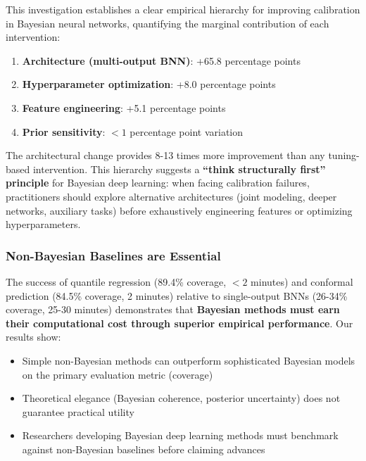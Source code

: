 This investigation establishes a clear empirical hierarchy for improving calibration in Bayesian neural networks, quantifying the marginal contribution of each intervention:

\begin{enumerate}
    \item \textbf{Architecture (multi-output BNN)}: +65.8 percentage points
    \item \textbf{Hyperparameter optimization}: +8.0 percentage points
    \item \textbf{Feature engineering}: +5.1 percentage points
    \item \textbf{Prior sensitivity}: $<1$ percentage point variation
\end{enumerate}

The architectural change provides 8-13 times more improvement than any tuning-based intervention. This hierarchy suggests a \textbf{``think structurally first'' principle} for Bayesian deep learning: when facing calibration failures, practitioners should explore alternative architectures (joint modeling, deeper networks, auxiliary tasks) before exhaustively engineering features or optimizing hyperparameters.

\subsubsection{Non-Bayesian Baselines are Essential}

The success of quantile regression (89.4\% coverage, $<2$ minutes) and conformal prediction (84.5\% coverage, 2 minutes) relative to single-output BNNs (26-34\% coverage, 25-30 minutes) demonstrates that \textbf{Bayesian methods must earn their computational cost through superior empirical performance}. Our results show:

\begin{itemize}
    \item Simple non-Bayesian methods can outperform sophisticated Bayesian models on the primary evaluation metric (coverage)
    \item Theoretical elegance (Bayesian coherence, posterior uncertainty) does not guarantee practical utility
    \item Researchers developing Bayesian deep learning methods must benchmark against non-Bayesian baselines before claiming advances
\end{itemize}

